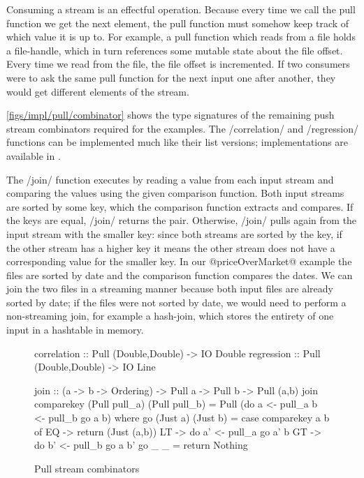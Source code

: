 Consuming a stream is an effectful operation.
Because every time we call the pull function we get the next element, the pull function must somehow keep track of which value it is up to.
For example, a pull function which reads from a file holds a file-handle, which in turn references some mutable state about the file offset.
Every time we read from the file, the file offset is incremented.
If two consumers were to ask the same pull function for the next input one after another, they would get different elements of the stream.


\autoref{figs/impl/pull/combinator} shows the type signatures of the remaining push stream combinators required for the examples.
The \Hs/correlation/ and \Hs/regression/ functions can be implemented much like their list versions; implementations are available in .

The \Hs/join/ function executes by reading a value from each input stream and comparing the values using the given comparison function.
Both input streams are sorted by some key, which the comparison function extracts and compares.
If the keys are equal, \Hs/join/ returns the pair.
Otherwise, \Hs/join/ pulls again from the input stream with the smaller key: since both streams are sorted by the key, if the other stream has a higher key it means the other stream does not have a corresponding value for the smaller key.
In our @priceOverMarket@ example the files are sorted by date and the comparison function compares the dates.
We can join the two files in a streaming manner because both input files are already sorted by date; if the files were not sorted by date, we would need to perform a non-streaming join, for example a hash-join, which stores the entirety of one input in a hashtable in memory.


\begin{figure}
\begin{haskell}
correlation :: Pull (Double,Double) -> IO Double
regression  :: Pull (Double,Double) -> IO Line

join        :: (a -> b -> Ordering) -> Pull a -> Pull b -> Pull (a,b)
join comparekey (Pull pull_a) (Pull pull_b) = Pull (do
   a <- pull_a
   b <- pull_b
   go a b)
 where
  go (Just a) (Just b)
   = case comparekey a b of
      EQ -> return (Just (a,b))
      LT -> do
        a' <- pull_a
        go a' b
      GT -> do
        b' <- pull_b
        go a b'
  go _ _ = return Nothing
\end{haskell}
\caption{Pull stream combinators}
\label{figs/impl/pull/combinator}
\end{figure}

